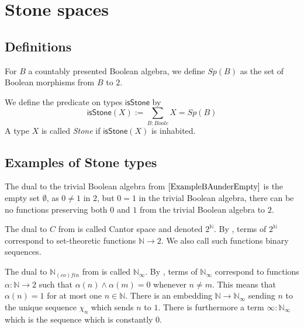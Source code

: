 \documentclass{../util/zariski-small}
\begin{document}
\section{Stone spaces}
\newcommand{\isSt}{\mathsf{isStone}}
\subsection{Definitions}
\begin{definition}
  For $B$ a countably presented Boolean algebra, we define $Sp(B)$ as the set of Boolean morphisms from $B$ to $2$. 
\end{definition}
\begin{definition}
  We define the predicate on types $\isSt$ by 
  \begin{equation}
    \isSt(X) := \sum\limits_{B : Boole} X = Sp(B)
  \end{equation} 
  A type $X$ is called \textit{Stone} if $\isSt(X)$ is inhabited.
\end{definition}
\subsection{Examples of Stone types}
\begin{example}\label{ExampleBAunderEmpty}
  The dual to the trivial Boolean algebra from $\Cref{ExampleBAunderEmpty}$ is the empty set $\emptyset$, 
  as $0\neq 1$ in $2$, but $0=1$ in the trivial Boolean algebra, there can be no functions preserving both $0$ and $1$ 
  from the trivial Boolean algebra to $2$. 
\end{example}
\begin{example}
  The dual to $C$ from  is called Cantor space 
  and denoted $2^\mathbb N$. 
  By , terms of $2^\mathbb N$ 
  correspond to set-theoretic functions $\mathbb N \to 2$. 
  We also call such functions binary sequences. 
\end{example}
\begin{example}
  The dual to $\mathbb N_{(co)fin}$ from  is called 
  $\mathbb N_\infty$. By , terms of $\mathbb N_\infty$ 
  correspond to functions $\alpha: \mathbb N \to 2$ such that $\alpha(n) \wedge \alpha(m) = 0$ 
  whenever $n \neq m$. This means that $\alpha(n) = 1$ for at most one $n\in\mathbb N$. 
  There is an embedding $\mathbb N \to \mathbb N_\infty$ sending $n$ to the unique sequence $\chi_n$
  which sends $n$ to $1$. 
  There is furthermore a term $\infty:\mathbb N_\infty$ which is the sequence which is constantly $0$. 
\end{example}
\end{document}
